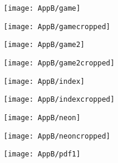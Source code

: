 \documentclass[draft,final]{vutinfth} %
\begin{document}
\begin{appendices}
\begin{figure}[H]
		\end{figure} 
		\begin{figure}[H]
			\centering
			\begin{subfigure}[b]{0.45\columnwidth}
				\centering
				\texttt{[image: AppB/game]}
			\end{subfigure}
			\begin{subfigure}[b]{0.45\columnwidth}
				\centering
				\texttt{[image: AppB/gamecropped]}
			\end{subfigure}
		\end{figure}    
		\begin{figure}[H]
			\centering
			\begin{subfigure}[b]{0.45\columnwidth}
				\centering
				\texttt{[image: AppB/game2]}
			\end{subfigure}
			\begin{subfigure}[b]{0.45\columnwidth}
				\centering
				\texttt{[image: AppB/game2cropped]}
			\end{subfigure}
		\end{figure}
		\begin{figure}[H]
			\centering
			\begin{subfigure}[b]{0.45\columnwidth}
				\centering
				\texttt{[image: AppB/index]}
			\end{subfigure}
			\begin{subfigure}[b]{0.45\columnwidth}
				\centering
				\texttt{[image: AppB/indexcropped]}
			\end{subfigure}
		\end{figure}    
		\begin{figure}[H]
			\centering
			\begin{subfigure}[b]{0.45\columnwidth}
				\centering
				\texttt{[image: AppB/neon]}
			\end{subfigure}
			\begin{subfigure}[b]{0.45\columnwidth}
				\centering
				\texttt{[image: AppB/neoncropped]}
			\end{subfigure}
		\end{figure} 
		\begin{figure}[H]
			\centering
			\begin{subfigure}[b]{0.45\columnwidth}
				\centering
				\texttt{[image: AppB/pdf1]}
			\end{subfigure}
			\begin{subfigure}[b]{0.45\columnwidth}

\end{subfigure}
\end{figure}
\end{appendices}
\end{document}
